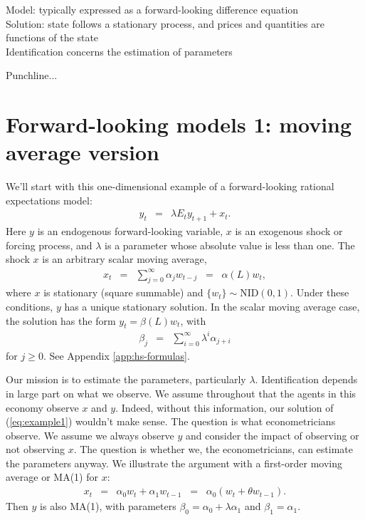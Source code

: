 \documentclass[11pt]{article}
\begin{document}
{Model:  typically expressed as a forward-looking difference equation \\
Solution:  state follows a stationary process, and 
prices and quantities are functions of the state \\
Identification concerns the estimation of parameters

Punchline...  


\section{Forward-looking models 1:  moving average version}



We'll start with this one-dimensional example of a forward-looking
rational expectations model:
\begin{eqnarray}
    y_t &=& \lambda E_t y_{t+1} + x_t .
    \label{eq:example1}
\end{eqnarray}
Here $y$ is an endogenous forward-looking variable,
$x$ is an exogenous shock or forcing process,
and $\lambda$ is a parameter whose absolute value is less than one.
The shock $x$ is an arbitrary scalar moving average,
\begin{eqnarray*}
    x_t &=& \sum_{j=0}^\infty \alpha_j w_{t-j} \;\;=\;\; \alpha(L) w_t ,
\end{eqnarray*}
where $x$ is stationary (square summable) and
$ \{ w_t \} \sim \mbox{NID}(0,1) $.
Under these conditions, $y$ has a unique stationary solution.
In the scalar moving average case, the solution has the form
$  y_t = \beta(L) w_t  $,
with
\begin{eqnarray*}
    \beta_j &=& \sum_{i=0}^\infty \lambda^i \alpha_{j+i}
\end{eqnarray*}
for $j\geq 0$.
See Appendix \ref{app:hs-formulas}.

Our mission is to estimate the parameters,
particularly $\lambda$.
Identification depends in large part on what we observe.
We assume throughout that the agents in this economy
observe $x$ and $y$.
Indeed, without this information, our solution
of (\ref{eq:example1}) wouldn't make sense.
The question is what econometricians observe.
We assume we always observe $y$ and consider
the impact of observing or not observing $x$.
The question is whether we, the econometricians,
can estimate the parameters anyway.
We illustrate the argument with a first-order
moving average or MA(1) for $x$:
\begin{eqnarray*}
    x_t &=& \alpha_0 w_t + \alpha_1 w_{t-1}
        \;\;=\;\; \alpha_{0} (w_t + \theta w_{t-1}) .
\end{eqnarray*}
Then $y$ is also MA(1),
with parameters $\beta_0 = \alpha_0 + \lambda \alpha_1$ and $\beta_1 = \alpha_1$.

}
\end{document}
